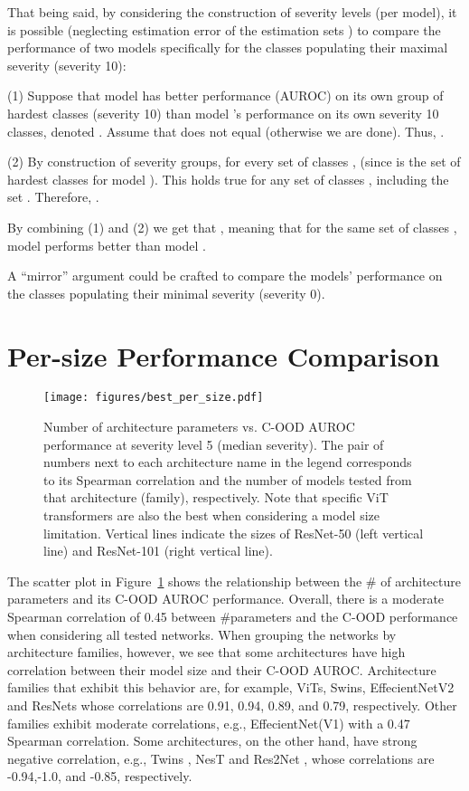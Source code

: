 \documentclass[table]{article} \usepackage{PRIMEarxiv}
\begin{document}
That being said, by considering the construction of severity levels (per model), it is possible (neglecting estimation error of the estimation sets ) to compare the performance of two models specifically for the classes populating their maximal severity (severity 10):

(1) Suppose that model  has better performance (AUROC) on its own group  of hardest classes (severity 10) than model 's performance on its own severity 10 classes, denoted . Assume that  does not equal  (otherwise we are done). Thus, .

(2) By construction of severity groups, for every set of classes ,  (since  is the set of hardest classes for model ). This holds true for any set of classes , including the set . Therefore, .

By combining (1) and (2) we get that , meaning that for the same set of classes , model  performs better than model .

A ``mirror'' argument could be crafted to compare the models' performance on the classes populating their minimal severity (severity 0).

\section{Per-size Performance Comparison}
\label{sec:OOD-per-size}
\begin{figure}[htb]
    \centering
    \texttt{[image: figures/best\_per\_size.pdf]}
    \caption{Number of architecture parameters vs. C-OOD AUROC performance at severity level 5 (median severity). The pair of numbers next to each architecture name in the legend corresponds to its Spearman correlation
    and the number of models tested from that architecture (family), respectively. 
    Note that specific ViT transformers are also the best when considering a model size limitation. Vertical lines indicate the sizes of ResNet-50 (left vertical line) and ResNet-101 (right vertical line).}
    \label{fig:best per size}
\end{figure}

The scatter plot in Figure~\ref{fig:best per size} shows the relationship between the \# of 
architecture parameters and its C-OOD AUROC performance.
Overall, there is a moderate Spearman correlation of 0.45 between \#parameters and the C-OOD performance when considering all tested networks. When grouping the networks by architecture families, however, we see that some architectures have high correlation between 
their model size and their C-OOD AUROC.
Architecture families that exhibit this behavior are, for example,  ViTs, Swins, EffecientNetV2 and ResNets  whose correlations are 0.91, 0.94, 0.89, and 0.79, respectively. Other families exhibit moderate correlations, e.g.,  EffecientNet(V1) with a 0.47 Spearman correlation. 
Some architectures, on the other hand, have  strong negative correlation, e.g., 
Twins \cite{chu2021twins}, NesT \cite{zhang2020resnest} and Res2Net \cite{Gao_2021}, whose correlations are
 -0.94,-1.0, and -0.85, respectively.
\end{document}
